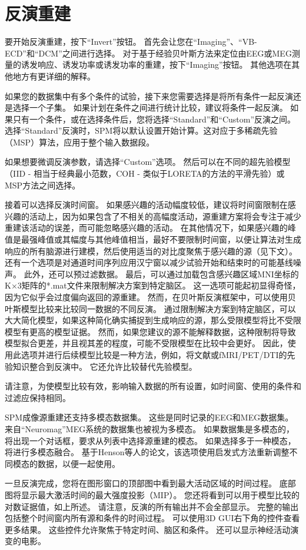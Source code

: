 \section{反演重建}

要开始反演重建，按下“Invert”按钮。
首先会让您在“Imaging”、“VB-ECD”和“DCM”之间进行选择。
对于基于经验贝叶斯方法来定位由EEG或MEG测量的诱发响应、诱发功率或诱发功率的重建，按下“Imaging”按钮。
其他选项在其他地方有更详细的解释。

如果您的数据集中有多个条件的试验，接下来您需要选择是将所有条件一起反演还是选择一个子集。
如果计划在条件之间进行统计比较，建议将条件一起反演。
如果只有一个条件，或在选择条件后，您将选择“Standard”和“Custom”反演之间。
选择“Standard”反演时，SPM将以默认设置开始计算。这对应于多稀疏先验（MSP）算法，应用于整个输入数据段。

如果想要微调反演参数，请选择“Custom”选项。
然后可以在不同的超先验模型（IID - 相当于经典最小范数，COH - 类似于LORETA的方法的平滑先验）或MSP方法之间选择。

接着可以选择反演时间窗。
如果感兴趣的活动幅度较低，建议将时间窗限制在感兴趣的活动上，因为如果包含了不相关的高幅度活动，源重建方案将会专注于减少重建该活动的误差，而可能忽略感兴趣的活动。
在其他情况下，如果感兴趣的峰值是最强峰值或其幅度与其他峰值相当，最好不要限制时间窗，以便让算法对生成响应的所有脑源进行建模，然后使用适当的对比度聚焦于感兴趣的源（见下文）。
还有一个选项是对通道时间序列应用汉宁窗以减少试验开始和结束时的可能基线噪声。
此外，还可以预过滤数据。
最后，可以通过加载包含感兴趣区域MNI坐标的K×3矩阵的*.mat文件来限制解决方案到特定脑区。
这一选项可能起初显得奇怪，因为它似乎会过度偏向返回的源重建。
然而，在贝叶斯反演框架中，可以使用贝叶斯模型比较来比较同一数据的不同反演。
通过限制解决方案到特定脑区，可以大大简化模型，如果这种简化确实捕捉到生成响应的源，那么受限模型将比不受限模型有更高的模型证据。
然而，如果您建议的源不能解释数据，这种限制将导致模型拟合更差，并且视其差的程度，可能不受限模型在比较中会更好。
因此，使用此选项并进行后续模型比较是一种方法，例如，将文献或fMRI/PET/DTI的先验知识整合到反演中。
它还允许比较替代先验模型。

请注意，为使模型比较有效，影响输入数据的所有设置，如时间窗、使用的条件和过滤应保持相同。

SPM成像源重建还支持多模态数据集。
这些是同时记录的EEG和MEG数据集。
来自“Neuromag”MEG系统的数据集也被视为多模态。
如果数据集是多模态的，将出现一个对话框，要求从列表中选择源重建的模态。
如果选择多于一种模态，将进行多模态融合。
基于Henson等人的论文，该选项使用启发式方法重新调整不同模态的数据，以便一起使用。

一旦反演完成，您将在图形窗口的顶部图中看到最大活动区域的时间过程。
底部图将显示最大激活时间的最大强度投影（MIP）。
您还将看到可以用于模型比较的对数证据值，如上所述。
请注意，反演的所有输出并不会全部显示。
完整的输出包括整个时间窗内所有源和条件的时间过程。
可以使用3D GUI右下角的控件查看更多结果。
这些控件允许聚焦于特定时间、脑区和条件。
还可以显示神经活动演变的电影。


